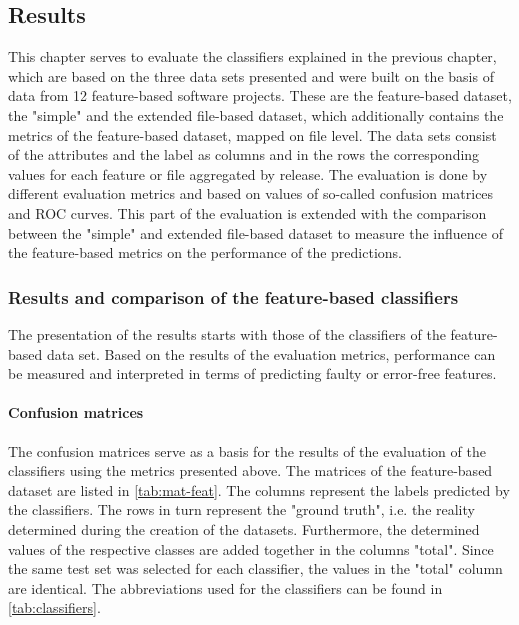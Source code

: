 \subsection{Results}

This chapter serves to evaluate the classifiers explained in the previous chapter, which are based on the three data sets presented and were built on the basis of data from 12 feature-based software projects. These are the feature-based dataset, the "simple" and the extended file-based dataset, which additionally contains the metrics of the feature-based dataset, mapped on file level. The data sets consist of the attributes and the label as columns and in the rows the corresponding values for each feature or file aggregated by release. The evaluation is done by different evaluation metrics and based on values of so-called confusion matrices and ROC curves. This part of the evaluation is extended with the comparison between the "simple" and extended file-based dataset to measure the influence of the feature-based metrics on the performance of the predictions.

\subsubsection*{Results and comparison of the feature-based classifiers}

The presentation of the results starts with those of the classifiers of the feature-based data set. Based on the results of the evaluation metrics, performance can be measured and interpreted in terms of predicting faulty or error-free features. 

\paragraph{Confusion matrices}
The confusion matrices serve as a basis for the results of the evaluation of the classifiers using the metrics presented above. The matrices of the feature-based dataset are listed in \autoref{tab:mat-feat}. The columns represent the labels predicted by the classifiers. The rows in turn represent the "ground truth", i.e. the reality determined during the creation of the datasets. Furthermore, the determined values of the respective classes are added together in the columns "total". Since the same test set was selected for each classifier, the values in the "total" column are identical. The abbreviations used for the classifiers can be found in \autoref{tab:classifiers}.

